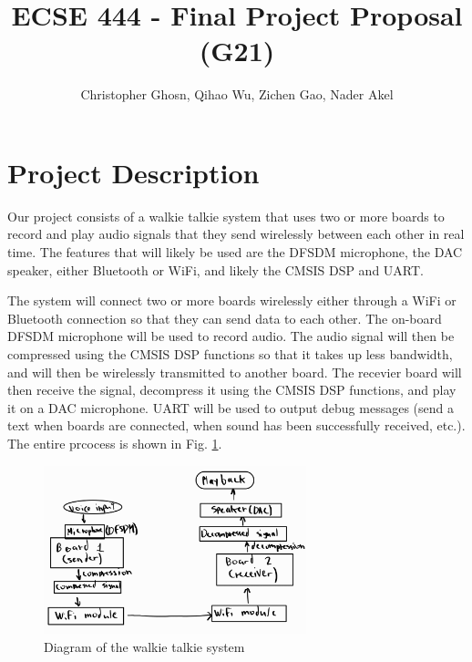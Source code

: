 \documentclass[journal]{IEEEtran}
\begin{document}
\title{ECSE 444 - Final Project Proposal (G21)}

\author{Christopher Ghosn, Qihao Wu, Zichen Gao, Nader Akel}

\maketitle

\section{Project Description}
Our project consists of a walkie talkie system that uses two or more boards to record and play audio signals that they send wirelessly between each other in real time. The features that will likely be used are the DFSDM microphone, the DAC speaker, either Bluetooth or WiFi, and likely the CMSIS DSP and UART.

The system will connect two or more boards wirelessly either through a WiFi or Bluetooth connection so that they can send data to each other. The on-board DFSDM microphone will be used to record audio. The audio signal will then be compressed using the CMSIS DSP functions so that it takes up less bandwidth, and will then be wirelessly transmitted to another board. The recevier board will then receive the signal, decompress it using the CMSIS DSP functions, and play it on a DAC microphone. UART will be used to output debug messages (send a text when boards are connected, when sound has been successfully received, etc.). The entire prcocess is shown in Fig. \ref{Diagram}.

\begin{figure}[H]
    \centering
    \includegraphics[width = 3in]{bibtex/Images/Diagram.png}
    \caption{Diagram of the walkie talkie system}
    \label{Diagram}
\end{figure}
\end{document}
